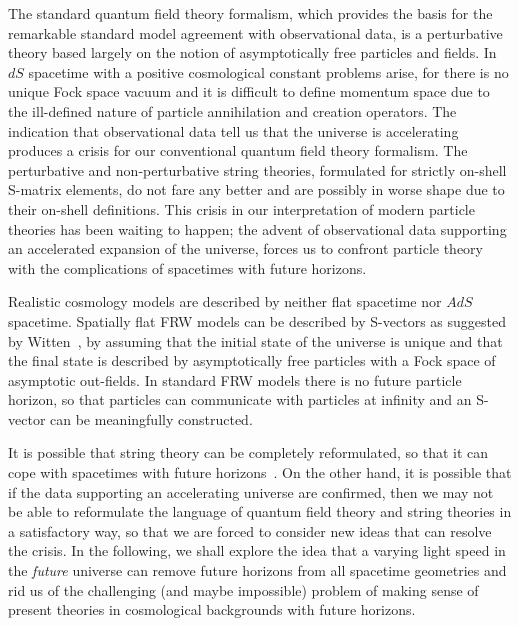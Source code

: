 \documentclass[a4paper,12pt]{article}
\begin{document}
The standard quantum field theory formalism, which provides the basis for
the remarkable standard model agreement with observational data, is a
perturbative theory based largely on the notion of asymptotically free
particles and fields. In $dS$ spacetime with a positive cosmological
constant problems arise, for there is no unique Fock space vacuum and it is
difficult to define momentum space due to the ill-defined nature of
particle annihilation and creation operators. The indication that
observational data tell us that the universe is accelerating produces a
crisis for our conventional quantum field theory formalism. The
perturbative and non-perturbative string theories, formulated for strictly
on-shell S-matrix elements, do not fare any better and are possibly in
worse shape due to their on-shell definitions. This crisis in our
interpretation of modern particle theories has been waiting to happen; the
advent of observational data supporting an accelerated expansion of the
universe, forces us to confront particle theory with the complications of
spacetimes with future horizons.

Realistic cosmology models are described by neither flat
spacetime nor $AdS$ spacetime. Spatially flat FRW models can be described
by S-vectors as suggested by Witten~\cite{Witten}, by assuming that the
initial state of the universe is unique and that the final state is
described by asymptotically free particles with a Fock space of asymptotic
out-fields. In standard FRW models there is no future particle horizon, so
that particles can communicate with particles at infinity and an S-vector
can be meaningfully constructed.

It is possible that string theory can be completely reformulated, so that
it can cope with spacetimes with future horizons~\cite{Banks}. On the other
hand, it is possible that if the data supporting an accelerating universe
are confirmed, then we may not be able to reformulate the language of
quantum field theory and string theories in a satisfactory way, so that we
are forced to consider new ideas that can resolve the crisis. In the
following, we shall explore the idea that a varying light speed in the
{\it future} universe can remove future horizons from all spacetime
geometries and rid us of the challenging (and maybe impossible) problem
of making sense of present theories in cosmological backgrounds with
future horizons.
\end{document}
